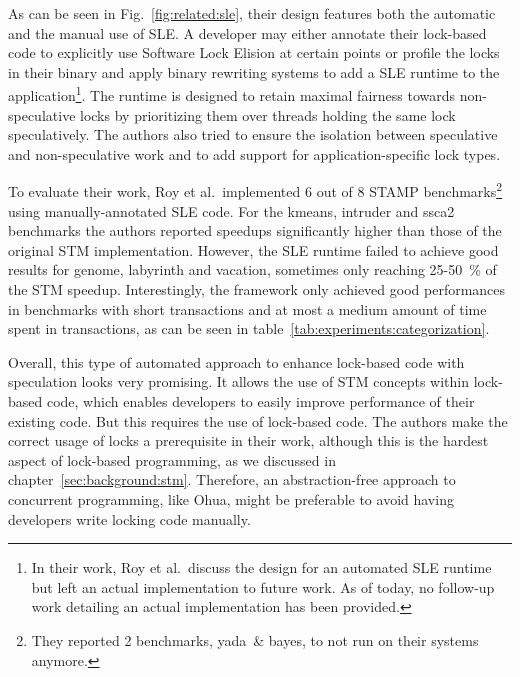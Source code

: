 As can be seen in Fig.~\ref{fig:related:sle}, their design features both the automatic and the manual use of SLE.
A developer may either annotate their lock-based code to explicitly use Software Lock Elision at certain points or profile the locks in their binary and apply binary rewriting systems to add a SLE runtime to the application\footnote{In their work, Roy et al.\ discuss the design for an automated SLE runtime but left an actual implementation to future work. As of today, no follow-up work detailing an actual implementation has been provided.}.
The runtime is designed to retain maximal fairness towards non-speculative locks by prioritizing them over threads holding the same lock speculatively.
The authors also tried to ensure the isolation between speculative and non-speculative work and to add support for application-specific lock types.

To evaluate their work, Roy et al.\ implemented 6 out of 8 STAMP benchmarks\footnote{They reported 2 benchmarks, yada~\& bayes, to not run on their systems anymore.} using manually-annotated SLE code.
For the kmeans, intruder and ssca2 benchmarks the authors reported speedups significantly higher than those of the original STM implementation.
However, the SLE runtime failed to achieve good results for genome, labyrinth and vacation, sometimes only reaching 25-50~\% of the STM speedup.
Interestingly, the framework only achieved good performances in benchmarks with short transactions and at most a medium amount of time spent in transactions, as can be seen in table~\ref{tab:experiments:categorization}.

Overall, this type of automated approach to enhance lock-based code with speculation looks very promising.
It allows the use of STM concepts within lock-based code, which enables developers to easily improve performance of their existing code.
But this requires the use of lock-based code.
The authors make the correct usage of locks a prerequisite in their work, although this is the hardest aspect of lock-based programming, as we discussed in chapter~\ref{sec:background:stm}.
Therefore, an abstraction-free approach to concurrent programming, like Ohua, might be preferable to avoid having developers write locking code manually.

